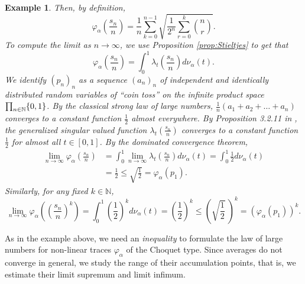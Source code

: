 \documentclass[a4paper,12pt]{amsart}
\newtheorem{example}[definition]{Example}
\newcommand{\N}{\mathbb{N}}
\begin{document}
\begin{example}
Then, by definition, 
\[   \varphi_{\alpha}(\frac{s_n}{n}) = \frac{1}{n} \sum_{k=0}^{n-1} \sqrt{\frac{1}{2^n} \sum_{r=0}^k  \binom{n}{r} }.  \]
To compute the limit as $n \rightarrow \infty$, we use Proposition \ref{prop:Stieltjes} to get that 
$$
\varphi_{\alpha}(\frac{s_n}{n}) = \int_0^1 \lambda_t(\frac{s_n}{n}) d\nu_{\alpha}(t). 
$$
We identify  $(p_n)_n$ as a sequence $(a_n)_n$ of independent and identically distributed random variables of ``coin toss'' on 
the infinite product space $\prod_{n \in {\Bbb N}} \{0,1\}$.  By the classical strong law of large numbers, 
$\frac{1}{n}(a_1 + a_2 + \dots +a_n)$ converges to a constant function $\frac{1}{2}$ almost everywhere.  
By  Proposition 3.2.11 in \cite{D-P-S},  the generalized singular valued function $\lambda_t(\frac{s_n}{n})$ converges to a constant function $\frac{1}{2}$ for almost all $t \in [0,1]$.  
By the dominated convergence theorem, 
\begin{align*}
  \lim_{n \to \infty} \varphi_{\alpha}(\frac{s_n}{n}) 
  & = \int_0^1  \lim_{n \to \infty} \lambda_t(\frac{s_n}{n})  d\nu_{\alpha}(t) 
   = \int_0^1 \frac{1}{2} d\nu_{\alpha}(t) \\
  & = \frac{1}{2} \leq {\sqrt {\frac{1}{2}}} = \varphi_{\alpha}(p_1). 
\end{align*}
Similarly, for any fixed $k \in \N$, 
$$
\lim_{n \to \infty} \varphi_{\alpha}((\frac{s_n}{n})^k) 
= \int_0^1 (\frac{1}{2})^k d\nu_{\alpha}(t) = (\frac{1}{2})^k 
\leq ({\sqrt {\frac{1}{2}}}\ )^k = (\varphi_{\alpha}(p_1))^k.
$$ 
\end{example}

As in the example above, we need an {\it inequality} to formulate the law of large numbers for non-linear 
traces $\varphi_{\alpha}$ of the Choquet type. 
Since averages do not converge in general, we study the range of their accumulation points, that is, 
we estimate their limit supremum and limit infimum. 
\end{document}
